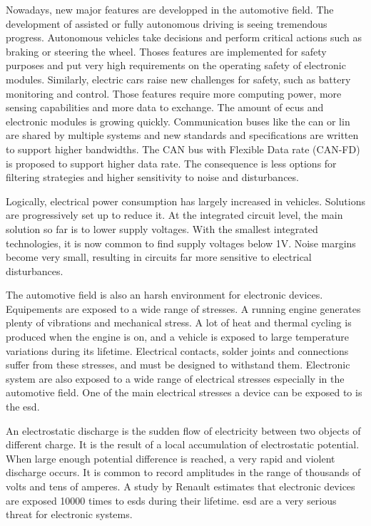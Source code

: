 Nowadays, new major features are developped in the automotive field.
The development of assisted or fully autonomous driving is seeing tremendous progress.
Autonomous vehicles take decisions and perform critical actions such as braking or steering the wheel.
Thoses features are implemented for safety purposes and put very high requirements on the operating safety of electronic modules.
Similarly, electric cars raise new challenges for safety, such as battery monitoring and control.
Those features require more computing power, more sensing capabilities and more data to exchange.
The amount of \gls{ecu}s and electronic modules is growing quickly.
Communication buses like the \gls{can} \cite{CAN} or \gls{lin} \cite{LIN} are shared by multiple systems and new standards and specifications are written to support higher bandwidths.
The CAN bus with Flexible Data rate (CAN-FD) is proposed to support higher data rate.
The consequence is less options for filtering strategies and higher sensitivity to noise and disturbances.

Logically, electrical power consumption has largely increased in vehicles.
Solutions are progressively set up to reduce it.
At the integrated circuit level, the main solution so far is to lower supply voltages.
With the smallest integrated technologies, it is now common to find supply voltages below 1V.
Noise margins become very small, resulting in circuits far more sensitive to electrical disturbances.

The automotive field is also an harsh environment for electronic devices.
Equipements are exposed to a wide range of stresses.
A running engine generates plenty of vibrations and mechanical stress.
A lot of heat and thermal cycling is produced when the engine is on, and a vehicle is exposed to large temperature variations during its lifetime.
Electrical contacts, solder joints and connections suffer from these stresses, and must be designed to withstand them.
Electronic system are also exposed to a wide range of electrical stresses especially in the automotive field.
One of the main electrical stresses a device can be exposed to is the \gls{esd}.

An electrostatic discharge is the sudden flow of electricity between two objects of different charge.
It is the result of a local accumulation of electrostatic potential.
When large enough potential difference is reached, a very rapid and violent discharge occurs.
It is common to record amplitudes in the range of thousands of volts and tens of amperes.
A study by Renault \cite{Renault-esd} estimates that electronic devices are exposed 10000 times to \gls{esd}s during their lifetime.
\gls{esd} are a very serious threat for electronic systems.

